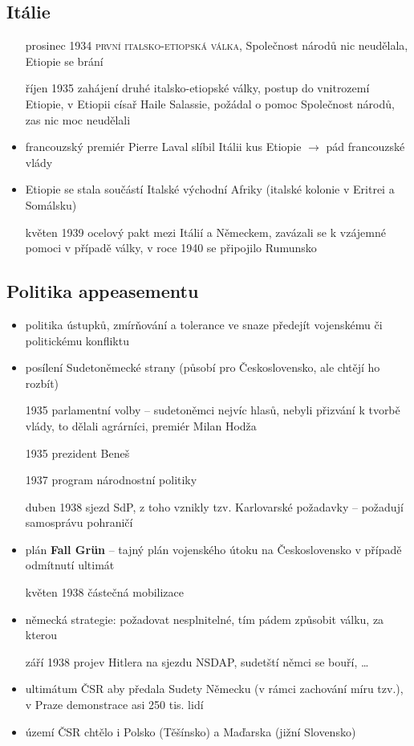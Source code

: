\documentclass{article}
\begin{document}
\subsection*{Itálie}
\begin{itemize}
    \item[prosinec 1934] \textsc{první italsko-etiopská válka}, Společnost národů nic neudělala, Etiopie se brání
    \item[říjen 1935] zahájení druhé italsko-etiopské války, postup do vnitrozemí Etiopie, v Etiopii císař Haile Salassie, požádal o pomoc Společnost národů, zas nic moc neudělali
    \item francouzský premiér Pierre Laval slíbil Itálii kus Etiopie $\rightarrow$ pád francouzské vlády
    \item Etiopie se stala součástí Italské východní Afriky (italské kolonie v Eritrei a Somálsku)
    \item[květen 1939] ocelový pakt mezi Itálií a Německem, zavázali se k vzájemné pomoci v případě války, v roce 1940 se připojilo Rumunsko
\end{itemize}

\subsection*{Politika appeasementu}
\begin{itemize}
    \item politika ústupků, zmírňování a tolerance ve snaze předejít vojenskému či politickému konfliktu
    \item posílení Sudetoněmecké strany (působí pro Československo, ale chtějí ho rozbít)
    \item[1935] parlamentní volby -- sudetoněmci nejvíc hlasů, nebyli přizvání k tvorbě vlády, to dělali agrárníci, premiér Milan Hodža
    \item[1935] prezident Beneš
    \item[1937] program národnostní politiky
    \item[duben 1938] sjezd SdP, z toho vznikly tzv. Karlovarské požadavky -- požadují samosprávu pohraničí
    \item plán \textbf{Fall Grün} -- tajný plán vojenského útoku na Československo v případě odmítnutí ultimát
    \item[květen 1938] částečná mobilizace
    \item německá strategie: požadovat nesplnitelné, tím pádem způsobit válku, za kterou
    \item[září 1938] projev Hitlera na sjezdu NSDAP, sudetští němci se bouří, \dots
    \item ultimátum ČSR aby předala Sudety Německu (v rámci zachování míru tzv.), v Praze demonstrace asi 250 tis. lidí
    \item území ČSR chtělo i Polsko (Těšínsko) a Maďarska (jižní Slovensko)
\end{itemize}
\end{document}
